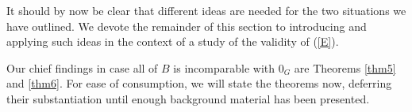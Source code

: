 \documentclass[pdflatex,sn-apa,11pt]{sn-jnl}%
\newtheorem{example}{Example}%
\newtheorem{remark}{Remark}%
\begin{document}



It should by now be clear that different ideas are needed for the two situations we have outlined. We devote the remainder of this section to introducing and applying such ideas in the context of a study of the validity of (\ref{E}).

Our chief findings in case all of $B$ is incomparable with $0_{G}$ are Theorems \ref{thm5} and \ref{thm6}. For ease of consumption, we will state the theorems now, deferring their substantiation until enough background material has been presented.
\end{document}
